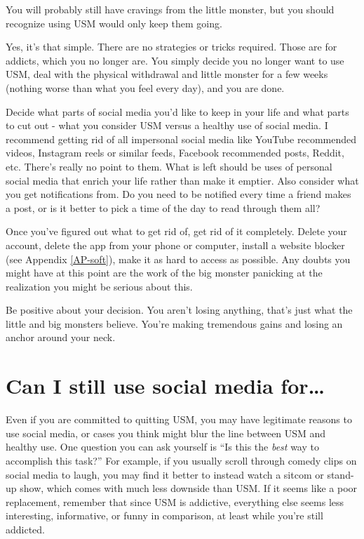 \documentclass[
  openany]{book}
\begin{document}
You will probably still have cravings from the little monster, but you should recognize using USM would only keep them going.

Yes, it's that simple. There are no strategies or tricks required. Those are for addicts, which you no longer are. You simply decide you no longer want to use USM, deal with the physical withdrawal and little monster for a few weeks (nothing worse than what you feel every day), and you are done.

Decide what parts of social media you'd like to keep in your life and what parts to cut out - what you consider USM versus a healthy use of social media. I recommend getting rid of all impersonal social media like YouTube recommended videos, Instagram reels or similar feeds, Facebook recommended posts, Reddit, etc. There's really no point to them. What is left should be uses of personal social media that enrich your life rather than make it emptier. Also consider what you get notifications from. Do you need to be notified every time a friend makes a post, or is it better to pick a time of the day to read through them all?

Once you've figured out what to get rid of, get rid of it completely. Delete your account, delete the app from your phone or computer, install a website blocker (see Appendix \ref{AP-soft}), make it as hard to access as possible. Any doubts you might have at this point are the work of the big monster panicking at the realization you might be serious about this.

Be positive about your decision. You aren't losing anything, that's just what the little and big monsters believe. You're making tremendous gains and losing an anchor around your neck.

\section{Can I still use social media for\ldots{}}\label{can-i-still-use-social-media-for}

Even if you are committed to quitting USM, you may have legitimate reasons to use social media, or cases you think might blur the line between USM and healthy use. One question you can ask yourself is ``Is this the \emph{best} way to accomplish this task?'' For example, if you usually scroll through comedy clips on social media to laugh, you may find it better to instead watch a sitcom or stand-up show, which comes with much less downside than USM. If it seems like a poor replacement, remember that since USM is addictive, everything else seems less interesting, informative, or funny in comparison, at least while you're still addicted.
\end{document}
